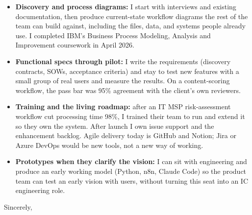 \documentclass[]{cover}
\begin{document}
{\raggedright{}\fontsize{11pt}{13pt}\selectfont
\begin{itemize}
    \item \textbf{Discovery and process diagrams:} I start with interviews and existing documentation, then produce current-state workflow diagrams the rest of the team can build against, including the files, data, and systems people already use. I completed IBM's Business Process Modeling, Analysis and Improvement coursework in April 2026.
    \item \textbf{Functional specs through pilot:} I write the requirements (discovery contracts, SOWs, acceptance criteria) and stay to test new features with a small group of real users and measure the results. On a content-scoring workflow, the pass bar was 95\% agreement with the client's own reviewers.
    \item \textbf{Training and the living roadmap:} after an IT MSP risk-assessment workflow cut processing time 98\%, I trained their team to run and extend it so they own the system. After launch I own issue support and the enhancement backlog. Agile delivery today is GitHub and Notion; Jira or Azure DevOps would be new tools, not a new way of working.
    \item \textbf{Prototypes when they clarify the vision:} I can sit with engineering and produce an early working model (Python, n8n, Claude Code) so the product team can test an early vision with users, without turning this seat into an IC engineering role.
\end{itemize}\par}
\vspace{2pt}


\begin{flushright}
\closing{Sincerely,}

\signature{Ethan Zaruba-Walker}
\end{flushright}
\end{document}
